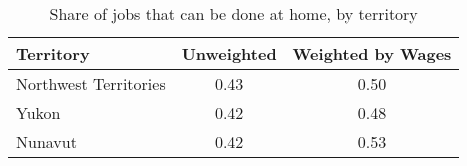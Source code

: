 \begin{table}[ht]
\centering
\caption{Share of jobs that can be done at home, by territory} 
\label{tab:territory}
\begin{tabular}{lcc}
  \hline
Territory & Unweighted & Weighted by Wages \\ 
  \hline
Northwest Territories & 0.43 & 0.50 \\ 
  Yukon & 0.42 & 0.48 \\ 
  Nunavut & 0.42 & 0.53 \\ 
   \hline
\end{tabular}
\end{table}
